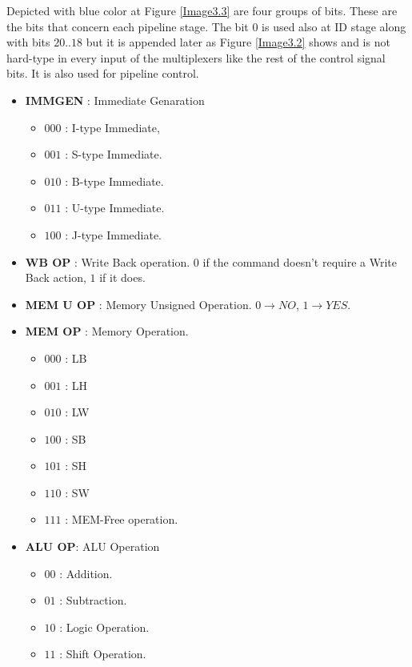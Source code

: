 	\vspace{2mm}
	
	Depicted with blue color at Figure \ref{Image3.3} are four groups of bits. These are the bits that concern each pipeline stage. The bit $0$ is used also at ID stage along with bits $20..18$ but it is appended later as Figure \ref{Image3.2} shows and is not hard-type in every input of the multiplexers like the rest of the control signal bits. It is also used for pipeline control.
	
	\clearpage
	\small
	\begin{itemize}
		\item \textbf{IMMGEN} : Immediate Genaration
		\begin{itemize}
			\setlength\itemsep{-0.1em}
			\item $000$ : I-type Immediate,
			\item $001$ : S-type Immediate.
			\item $010$ : B-type Immediate.
			\item $011$ : U-type Immediate.
			\item $100$ : J-type Immediate.
		\end{itemize}
		\item \textbf{WB OP} : Write Back operation. $0$ if the command doesn't require a Write Back action, $1$ if it does.
		\item \textbf{MEM U OP} : Memory Unsigned Operation. $0\rightarrow NO$, $1\rightarrow YES$.
		\item \textbf{MEM OP} : Memory Operation.
		\begin{itemize}
			\setlength\itemsep{-0.1em}
			\item $000$ : LB 
			\item $001$ : LH
			\item $010$ : LW
			\item $100$ : SB
			\item $101$ : SH
			\item $110$ : SW
			\item $111$ : MEM-Free operation.
		\end{itemize}
		\item \textbf{ALU OP}: ALU Operation 
		\begin{itemize}
			\setlength\itemsep{-0.1em}
			\item $00$ : Addition.
			\item $01$ : Subtraction.
			\item $10$ : Logic Operation.
			\item $11$ : Shift Operation.

\end{itemize}
\end{itemize}
